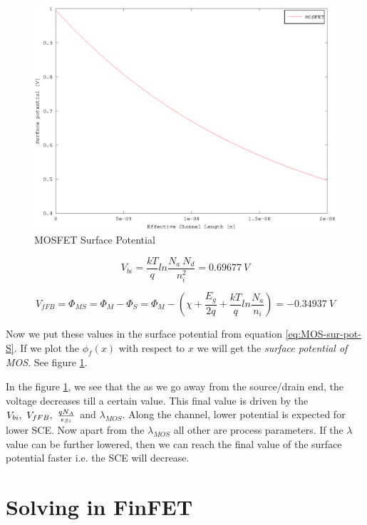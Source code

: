 \documentclass[a4paper]{article}
\begin{document}
\begin{figure}[!h]
  \includegraphics[width=\linewidth,height=0.65\linewidth]{./MOSFET_surface_potential_graph.eps}
  \caption{MOSFET Surface Potential}
  \label{fig:MOS-surf-pot-graph}
\end{figure}

\begin{equation}
  V_{bi} = \frac{kT}{q} ln\frac{N_{a}~N_{d}}{n_i^2} = 0.69677~V
\end{equation}

\begin{equation}
    V_{fFB} = \Phi_{MS} = \Phi_M - \Phi_S = \Phi_M - \left( \chi + \frac{E_g}{2q} + \frac{kT}{q}ln\frac{N_a}{n_i} \right) = -0.34937~V
\end{equation}

Now we put these values in the surface potential from equation \ref{eq:MOS-sur-pot-S}. If we plot the $\phi_f(x)$ with respect to $x$ we will get the \textit{surface potential of MOS}. See figure \ref{fig:MOS-surf-pot-graph}.

In the figure \ref{fig:MOS-surf-pot-graph}, we see that the as we go away from the source/drain end, the voltage decreases till a certain value. This final value is driven by the $V_{bi},~V_{fFB},~\frac{qN_A} {\epsilon_{Si}}$ and $\lambda_{MOS}$. Along the channel, lower potential is expected for lower SCE. Now apart from the $\lambda_{MOS}$ all other are process parameters. If the $\lambda$ value can be further lowered, then we can reach the final value of the surface potential faster i.e. the SCE will decrease.

\section{Solving \PE in FinFET}
\end{document}
